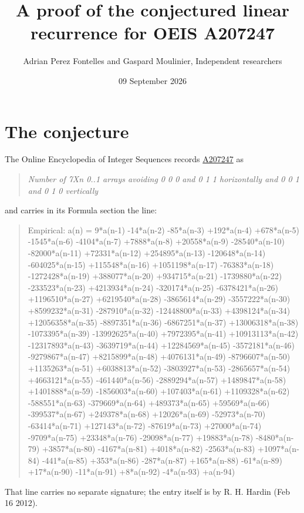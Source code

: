 \documentclass[11pt]{article}
\title{A proof of the conjectured linear recurrence for OEIS A207247}
\author{Adrian Perez Fontelles and Gaspard Moulinier, Independent researchers}
\date{09 September 2026}
\theoremstyle{definition}
\begin{document}
\maketitle
\section{The conjecture}

The Online Encyclopedia of Integer Sequences records \href{https://oeis.org/A207247}{A207247} as

\begin{quote}\itshape Number of 7Xn 0..1 arrays avoiding 0 0 0 and 0 1 1 horizontally and 0 0 1 and 0 1 0 vertically\end{quote}

and carries in its Formula section the line:

\begin{quote}\ttfamily Empirical: a(n) = 9*a(n-1) -14*a(n-2) -85*a(n-3) +192*a(n-4) +678*a(n-5) -1545*a(n-6) -4104*a(n-7) +7888*a(n-8) +20558*a(n-9) -28540*a(n-10) -82000*a(n-11) +72331*a(n-12) +254895*a(n-13) -120648*a(n-14) -604025*a(n-15) +115548*a(n-16) +1051198*a(n-17) -76383*a(n-18) -1272428*a(n-19) +388077*a(n-20) +934715*a(n-21) -1739880*a(n-22) -233523*a(n-23) +4213934*a(n-24) -320174*a(n-25) -6378421*a(n-26) +1196510*a(n-27) +6219540*a(n-28) -3865614*a(n-29) -3557222*a(n-30) +8599232*a(n-31) -287910*a(n-32) -12448800*a(n-33) +4398124*a(n-34) +12056358*a(n-35) -8897351*a(n-36) -6867251*a(n-37) +13006318*a(n-38) -1073395*a(n-39) -13992625*a(n-40) +7972395*a(n-41) +10913113*a(n-42) -12317893*a(n-43) -3639719*a(n-44) +12284569*a(n-45) -3572181*a(n-46) -9279867*a(n-47) +8215899*a(n-48) +4076131*a(n-49) -8796607*a(n-50) +1135263*a(n-51) +6038813*a(n-52) -3803927*a(n-53) -2865657*a(n-54) +4663121*a(n-55) -461440*a(n-56) -2889294*a(n-57) +1489847*a(n-58) +1401888*a(n-59) -1856003*a(n-60) +107403*a(n-61) +1109328*a(n-62) -588551*a(n-63) -379669*a(n-64) +489373*a(n-65) +59569*a(n-66) -399537*a(n-67) +249378*a(n-68) +12026*a(n-69) -52973*a(n-70) -63414*a(n-71) +127143*a(n-72) -87619*a(n-73) +27000*a(n-74) -9709*a(n-75) +23348*a(n-76) -29098*a(n-77) +19883*a(n-78) -8480*a(n-79) +3857*a(n-80) -4167*a(n-81) +4018*a(n-82) -2563*a(n-83) +1097*a(n-84) -441*a(n-85) +353*a(n-86) -287*a(n-87) +165*a(n-88) -61*a(n-89) +17*a(n-90) -11*a(n-91) +8*a(n-92) -4*a(n-93) +a(n-94)\end{quote}

That line carries no separate signature; the entry itself is by R. H. Hardin (Feb 16 2012).
\end{document}
